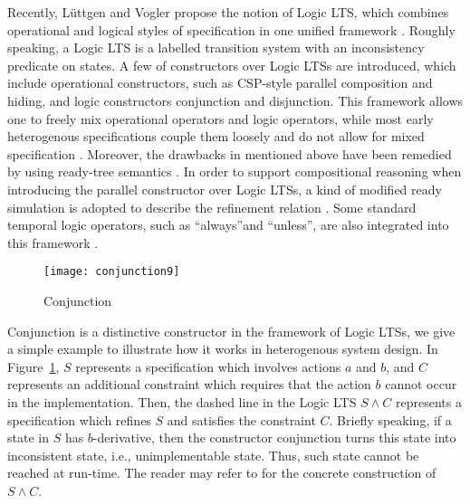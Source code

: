 \documentclass{elsarticle}
\theoremstyle{plain}
\theoremstyle{definition}
\begin{document}
    Recently, L{\"u}ttgen and Vogler propose the notion of Logic LTS, which combines operational and logical styles of specification in one unified framework \cite{Luttgen07,Luttgen10}.
    Roughly speaking, a Logic LTS is a labelled transition system with an inconsistency predicate on states.
    A few of constructors over Logic LTSs are introduced, which include operational constructors, such as CSP-style parallel composition and hiding, and logic constructors conjunction and disjunction.
    This framework allows one to freely mix operational operators and logic operators, while most early heterogenous specifications couple them loosely and do not allow for mixed specification \cite{Boudol92,Dam}.
    Moreover, the drawbacks in \cite{Cleaveland00,Cleaveland02} mentioned above have been remedied by using ready-tree semantics \cite{Luttgen07}.
    In order to support compositional reasoning when introducing the parallel constructor over Logic LTSs, a kind of modified ready simulation is adopted to describe the refinement relation \cite{Luttgen10}.
    Some standard temporal logic operators, such as \textquotedblleft always\textquotedblright and \textquotedblleft unless\textquotedblright, are also integrated into this framework \cite{Luttgen11}.

    \begin{figure}
    \begin{center}
        \texttt{[image: conjunction9]}
    \end{center}
    \caption{Conjunction}\label{F:CONJUNCTION}
    \end{figure}

    Conjunction is a distinctive constructor in the framework of Logic LTSs, we give a simple example to illustrate how it works in heterogenous system design. In Figure~\ref{F:CONJUNCTION}, $S$ represents a specification which involves actions $a$ and $b$, and $C$ represents an additional constraint which requires that the action $b$ cannot occur in the implementation.
    Then, the dashed line in the Logic LTS $S \wedge C$ represents a specification which refines $S$ and satisfies the constraint $C$.
    Briefly speaking, if a state in $S$ has $b$-derivative, then the constructor conjunction turns this state into inconsistent state, i.e., unimplementable state.
    Thus, such state cannot be reached at run-time.
    The reader may refer to \cite{Luttgen10} for the concrete construction of $S \wedge C$.
\end{document}
